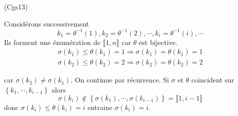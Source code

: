 \begin{tiny}(Cgs13)\end{tiny} Considérons successivement
\[
  k_1=\theta^{-1}(1), k_2=\theta^{-1}(2), \cdots , k_i=\theta^{-1}(i), \cdots
\]
Ils forment une énumération de $\llbracket 1,n \rrbracket$ car $\theta$ est bijective.
\begin{multline*}
  \sigma(k_1) \leq \theta(k_1)= 1 \Rightarrow \sigma(k_1) = \theta(k_1)= 1 \\
  \sigma(k_2) \leq \theta(k_2)= 2 \Rightarrow \sigma(k_2) = \theta(k_2)= 2
\end{multline*}

car $\sigma(k_2) \neq \sigma(k_1)$.\newline
On continue par récurrence.\newline
Si $\sigma$ et $\theta$ coincident sur $\left\lbrace k_1, \cdots, k_{i-1} \right\rbrace$ alors 
\[
  \sigma(k_i) \notin \left\lbrace \sigma(k_1), \cdots, \sigma(k_{i-1})\right\rbrace = \llbracket 1, i-1 \rrbracket 
\]
donc $\sigma(k_i)\leq \theta(k_i)=i$ entraine $\sigma(k_i) = i$.
